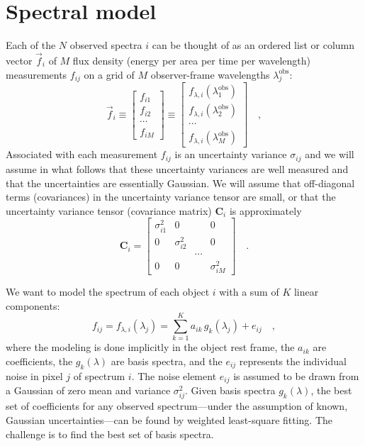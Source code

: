 \documentclass[12pt,preprint]{aastex}
\newcommand{\tv}[1]{\boldsymbol{#1}}
\begin{document}
\section{Spectral model}\label{sec:model}
Each of the $N$ observed spectra $i$ can be thought of as an ordered
list or column vector $\vec{f}_i$ of $M$ flux density (energy per area
per time per wavelength) measurements $f_{ij}$ on a grid of $M$
observer-frame wavelengths $\lambda^{\mathrm{obs}}_j$:
\begin{equation}
\vec{f}_i
\equiv \left[\begin{array}{c} f_{i1} \\
                              f_{i2} \\
                              \cdots \\
                              f_{iM} \end{array}\right]
\equiv \left[\begin{array}{c} f_{\lambda,i}(\lambda^{\mathrm{obs}}_1) \\
                              f_{\lambda,i}(\lambda^{\mathrm{obs}}_2) \\
                                                \cdots \\
                              f_{\lambda,i}(\lambda^{\mathrm{obs}}_M) \end{array}\right]
\quad ,
\end{equation}
Associated with each measurement $f_{ij}$ is an uncertainty variance
$\sigma_{ij}$ and we will assume in what follows that these
uncertainty variances are well measured and that the uncertainties are
essentially Gaussian.  We will assume that off-diagonal terms
(covariances) in the uncertainty variance tensor are small, or that
the uncertainty variance tensor (covariance matrix) $\tv{C}_i$ is
approximately
\begin{equation}
\tv{C}_i =
 \left[\begin{array}{cccc} \sigma_{i1}^2 & 0 & & 0 \\
                           0 & \sigma_{i2}^2 & & 0 \\
                           & & \cdots & \\
                           0 & 0 & & \sigma_{iM}^2 \end{array}\right]
\quad .
\end{equation}

We want to model the spectrum of each object $i$ with a sum of $K$ linear components:
\begin{equation}\label{eq:model}
f_{ij} = f_{\lambda,i}(\lambda_j) = \sum_{k=1}^{K} a_{ik}\,g_k(\lambda_j) + e_{ij}
\quad ,
\end{equation}
where the modeling is done implicitly in the object rest frame, the
$a_{ik}$ are coefficients, the $g_k(\lambda)$ are basis spectra, and
the $e_{ij}$ represents the individual noise in pixel $j$ of spectrum
$i$.  The noise element $e_{ij}$ is assumed to be drawn from a
Gaussian of zero mean and variance $\sigma_{ij}^2$.  Given basis
spectra $g_k(\lambda)$, the best set of coefficients for any observed
spectrum---under the assumption of known, Gaussian uncertainties---can
be found by weighted least-square fitting.  The challenge is to find
the best set of basis spectra.
\end{document}
